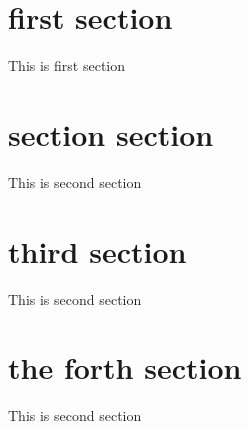 

\section{first section}\label{sec:a-first-section}
\textrm{This is first section}

\section{section section}\label{sec:a-section-section}
\textrm{This is second section}

\section{third section}\label{sec:c-section-section}
\textrm{This is second section}

\section{the forth section}\label{sec:the-forth-section}
\textrm{This is second section}
